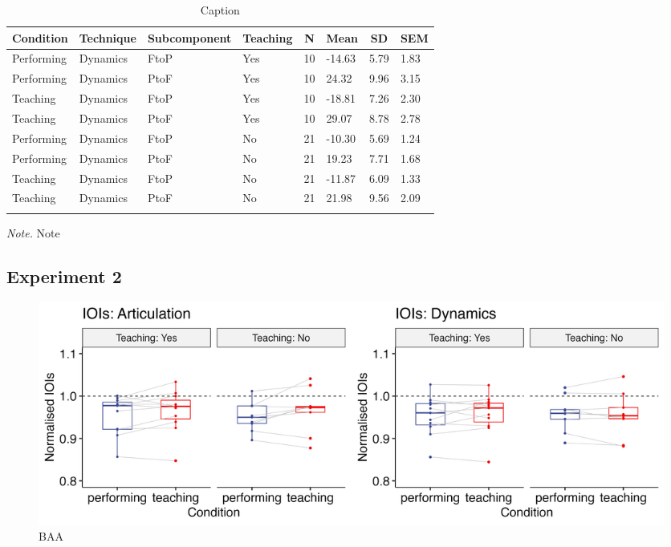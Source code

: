 \documentclass[
  man,floatsintext]{apa6}
\begin{document}
\begin{table}[tbp]

\begin{center}
\begin{threeparttable}

\caption{\label{tab:dyn-diff-teaching-desc-1}Caption}

\begin{tabular}{llllllll}
\toprule
Condition & \multicolumn{1}{c}{Technique} & \multicolumn{1}{c}{Subcomponent} & \multicolumn{1}{c}{Teaching} & \multicolumn{1}{c}{N} & \multicolumn{1}{c}{Mean} & \multicolumn{1}{c}{SD} & \multicolumn{1}{c}{SEM}\\
\midrule
Performing & Dynamics & FtoP & Yes & 10 & -14.63 & 5.79 & 1.83\\
Performing & Dynamics & PtoF & Yes & 10 & 24.32 & 9.96 & 3.15\\
Teaching & Dynamics & FtoP & Yes & 10 & -18.81 & 7.26 & 2.30\\
Teaching & Dynamics & PtoF & Yes & 10 & 29.07 & 8.78 & 2.78\\
Performing & Dynamics & FtoP & No & 21 & -10.30 & 5.69 & 1.24\\
Performing & Dynamics & PtoF & No & 21 & 19.23 & 7.71 & 1.68\\
Teaching & Dynamics & FtoP & No & 21 & -11.87 & 6.09 & 1.33\\
Teaching & Dynamics & PtoF & No & 21 & 21.98 & 9.56 & 2.09\\
\bottomrule
\addlinespace
\end{tabular}

\begin{tablenotes}[para]
\normalsize{\textit{Note.} Note}
\end{tablenotes}

\end{threeparttable}
\end{center}

\end{table}

\newpage

\hypertarget{experiment-2-5}{%
\subsection{Experiment 2}\label{experiment-2-5}}

\begin{figure}
\includegraphics[width=1\linewidth]{manuscript_files/figure-latex/plot-ioi-teaching-2-1} \caption{\label{fig:ioi-teaching-2}BAA}\label{fig:plot-ioi-teaching-2}
\end{figure}
\end{document}
